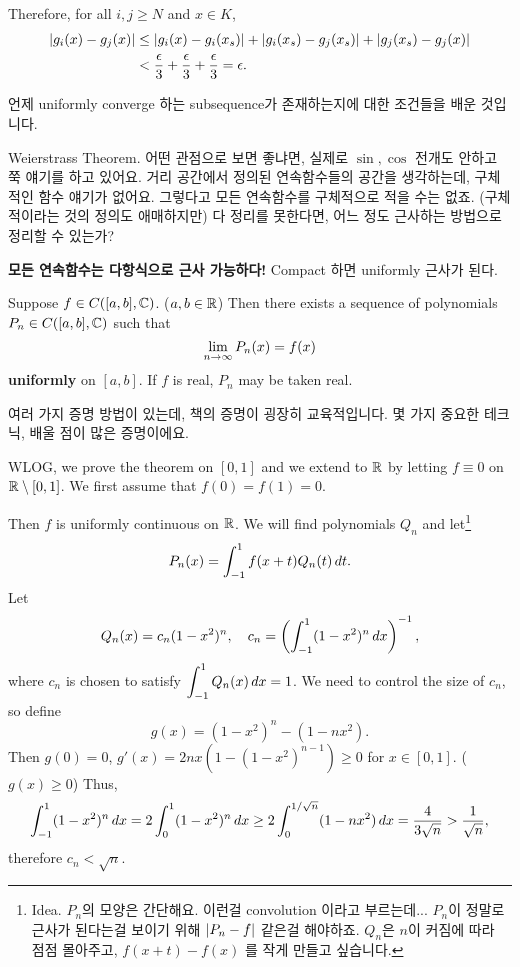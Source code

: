 Therefore, for all \(i, j \geq N\) and \(x \in K\),
\[
    \begin{aligned}
        \left| g_i(x) - g_j(x) \right| & \leq \left| g_i(x) - g_i(x_s) \right| + \left| g_i(x_s) - g_j(x_s) \right| + \left| g_j(x_s) - g_j(x) \right| \\
                              & < \frac{\epsilon}{3} + \frac{\epsilon}{3} + \frac{\epsilon}{3} = \epsilon.
    \end{aligned}
\]

언제 uniformly converge 하는 subsequence가 존재하는지에 대한 조건들을 배운 것입니다.

Weierstrass Theorem. 어떤 관점으로 보면 좋냐면, 실제로 \(\sin, \cos\) 전개도 안하고 쭉 얘기를 하고 있어요. 거리 공간에서 정의된 연속함수들의 공간을 생각하는데, 구체적인 함수 얘기가 없어요. 그렇다고 모든 연속함수를 구체적으로 적을 수는 없죠. (구체적이라는 것의 정의도 애매하지만) 다 정리를 못한다면, 어느 정도 근사하는 방법으로 정리할 수 있는가?

\textbf{모든 연속함수는 다항식으로 근사 가능하다!} Compact 하면 uniformly 근사가 된다.

  Suppose \(f \in C([a, b], \mathbb{C})\). (\(a, b\in \mathbb{R}\)) Then there exists a sequence of polynomials \(P_n \in C([a, b], \mathbb{C})\) such that
\[
    \lim_{n \rightarrow \infty} P_n(x) = f(x)
\]
\textbf{uniformly} on \([a, b]\). If \(f\) is real, \(P_n\) may be taken real.

여러 가지 증명 방법이 있는데, 책의 증명이 굉장히 교육적입니다. 몇 가지 중요한 테크닉, 배울 점이 많은 증명이에요.

\pf WLOG, we prove the theorem on \([0, 1]\) and we extend to \(\mathbb{R}\) by letting \(f \equiv 0\) on \(\mathbb{R} \setminus [0, 1]\). We first assume that \(f(0) = f(1) = 0\).

Then \(f\) is uniformly continuous on \(\mathbb{R}\). We will find polynomials \(Q_n\) and let\footnote{Idea. \(P_n\)의 모양은 간단해요. 이런걸 convolution 이라고 부르는데... \(P_n\)이 정말로 근사가 된다는걸 보이기 위해 \(\left| P_n - f \right|\) 같은걸 해야하죠. \(Q_n\)은 \(n\)이 커짐에 따라 점점 몰아주고, \(f(x + t) - f(x)\) 를 작게 만들고 싶습니다.}
\[
    P_n(x) = \int_{-1}^1 f(x+t) Q_n(t) \,d{t}.
\]
Let
\[
    Q_n(x) = c_n(1-x^2)^n, \quad c_n = \left(\int_{-1}^1 (1-x^2)^n \,d{x}\right)^{-1},
\]
where \(c_n\) is chosen to satisfy \(\displaystyle \int_{-1}^1 Q_n(x) \,d{x} = 1\). We need to control the size of \(c_n\), so define
\[
    g(x) = (1-x^2)^n - (1-nx^2).
\]
Then \(g(0) = 0\), \(g'(x) = 2nx(1 - (1-x^2)^{n-1})\geq 0\) for \(x \in [0, 1]\). (\(g(x) \geq 0\)) Thus,
\[
    \int_{-1}^1 (1-x^2)^n \,d{x} = 2\int_0^1 (1-x^2)^n \,d{x} \geq 2 \int_0^{1/\sqrt{n}} (1 - nx^2) \,d{x} = \frac{4}{3\sqrt{n}} > \frac{1}{\sqrt{n}},
\]
therefore \(c_n < \sqrt{n}\).

